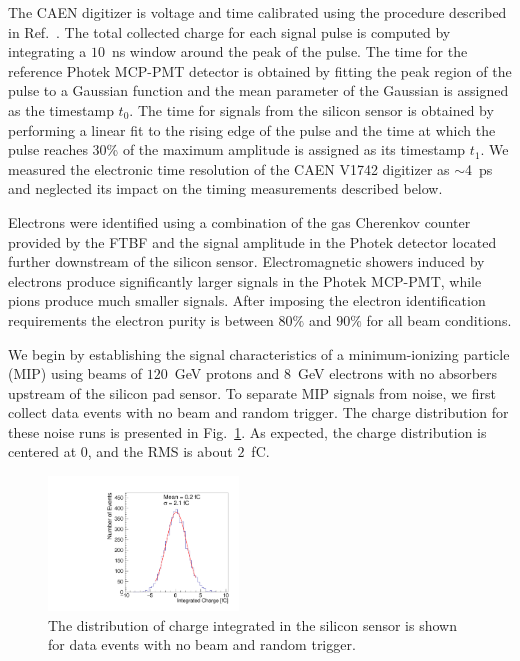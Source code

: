 \documentclass[preprint,1p]{elsarticle}
\begin{document}
The CAEN digitizer is voltage and time calibrated using the  procedure
described in Ref.~\cite{Kim201467}. The total collected charge for each signal
pulse is computed by integrating a $10$~ns window around the peak of the pulse.
The time for the reference Photek MCP-PMT detector is obtained by fitting the
peak region of the pulse to a Gaussian function and the mean parameter of the
Gaussian is assigned as the timestamp $t_0$. The time for signals from the
silicon sensor is obtained by performing a linear fit to the rising edge of the
pulse and the time at which the pulse reaches 30\% of the maximum amplitude is
assigned as its timestamp $t_1$. We measured the electronic time resolution
of the CAEN V1742 digitizer as $\sim$4~ps and neglected its impact on the timing
measurements described below.

Electrons were identified using a combination of the gas Cherenkov counter
provided by the FTBF and the signal amplitude in the Photek detector located further
downstream of the silicon sensor. Electromagnetic showers induced by electrons
produce significantly larger signals in the Photek MCP-PMT, while pions produce
much smaller signals. After imposing the electron identification 
requirements the electron purity is between $80\%$ and $90\%$ for all beam
conditions. 

We begin by establishing the signal characteristics of a minimum-ionizing
particle (MIP) using beams of $120$~GeV protons and $8$~GeV electrons with no
absorbers upstream of the silicon pad sensor. To separate MIP signals from
noise, we first collect data events with no beam and random trigger. The charge
distribution for these noise runs is presented in Fig.~\ref{fig:noise}. As expected,
the charge distribution is centered at $0$, and the RMS is about
$2$~fC. 

\begin{figure}[htbp] 
\centering
\includegraphics[width=0.45\textwidth]{plots/NoiseNoBeam_charge.pdf} 
\caption{The distribution of charge integrated in the silicon sensor is shown for data events with no beam and random trigger. } 
\label{fig:noise} 
\end{figure} 
\end{document}
